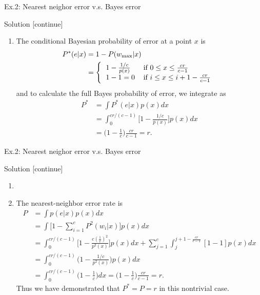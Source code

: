 \documentclass[compress,blue]{beamer}
\begin{document}
\begin{frame}{Ex.2: Nearest neighor error v.s. Bayes error}
	\begin{block}{Solution [continue]}
		\begin{enumerate}
			\item The conditional Bayesian probability of error at a point $x$ is 
			\begin{align}
				P^*(e|x) & = 1-P(w_{\max} |x) \\
				& = \left\{ 
				\begin{tabular}{ll}
				$1- \frac{1/c}{p(x)}$ & if $0 \leq x \leq \frac{cr}{c-1}$ \\
				$1 - 1 = 0$ & if $i \leq x \leq i+1-\frac{cr}{c-1}$
				\end{tabular}\right.
			\end{align}
			and to calculate the full Bayes probability of error, we integrate as 
			\vspace{-0.1in}
			\begin{align}
				P^* &= \int P^*(e|x)p(x) dx \\
				& = \int_{0}^{cr/(c-1)} \Big[1 - \frac{1/c}{p(x)}\Big] p(x)dx \\
				& = \big(1 - \frac{1}{c}\big) \frac{cr}{c-1} = r.
			\end{align}
		\end{enumerate}
	\end{block}
\end{frame}

\begin{frame}{Ex.2: Nearest neighor error v.s. Bayes error}
	\begin{block}{Solution [continue]}
		\small
		\begin{enumerate}
			\item<0> \vspace{-0.2in}
			\item The nearest-neighbor error rate is 
			\begin{align}
				P & = \int p(e|x) p(x) dx \\
				& = \int \Big[1-\sum_{i=1}^c P^2(w_i | x)\Big] p(x) dx \\
				& = \int_0^{cr/(c-1)}\Big[1 - \frac{c(\frac{1}{c})^2}{p^2(x)}\Big]p(x)dx + \sum_{j=1}^c\int_j^{j+1-\frac{cr}{c-1}}[1-1]p(x)dx \nonumber\\
				& = \int_0^{cr/(c-1)} \Big(1 - \frac{1/c}{p^2(x)}\Big)p(x)dx \\
				& = \int_0^{cr/(c-1)} \Big(1 - \frac{1}{c}\Big)dx = \Big(1-\frac{1}{c}\Big)\frac{cr}{c-1} = r.
			\end{align}
			Thus we have demonstrated that $P^* = P = r$ in this nontrivial case.
		\end{enumerate}
		\normalsize
	\end{block}
\end{frame}
\end{document}
